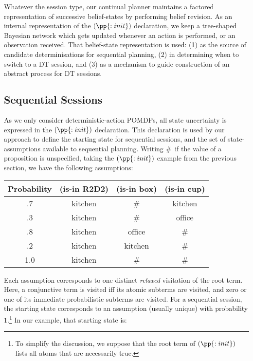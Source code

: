 Whatever the session type, our continual planner maintains a factored
representation of successive belief-states by performing belief
revision. As an internal representation of the $(\pp{:init})$
declaration, we keep a tree-shaped Bayesian network which gets updated
whenever an action is performed, or an observation received. That
belief-state representation is used: (1) as the source of candidate
determinisations for sequential planning, (2) in determining when to
switch to a DT session, and (3) as a mechanism to guide construction
of an abstract process for DT sessions.

\subsection{Sequential Sessions}

As we only consider deterministic-action POMDPs, all state
uncertainty is expressed in the $(\pp{:init})$ declaration. This
declaration is used by our approach to define the starting state for
sequential sessions, and the set of state-assumptions available to
sequential planning.  Writing \#\ if the value of a proposition is
unspecified, taking the $(\pp{:init})$ example from the previous
section, we have the following assumptions:

\small
\begin{tabular}{cccc}
\hline
Probability & (is-in R2D2)  & (is-in box)  & (is-in cup) \\
\hline
.7 & kitchen & \# &  kitchen\\
.3 & kitchen & \# & office \\
.8 & kitchen & office & \# \\
.2 & kitchen & kitchen & \# \\
1.0 & kitchen & \# & \# \\
\hline
\end{tabular}
\normalsize

\noindent Each assumption corresponds to one distinct {\em
relaxed} visitation of the root term. Here, a conjunctive term is
visited iff its atomic subterms are visited, and zero or one of its
immediate probabilistic subterms are visited. For a sequential
session, the starting state corresponds to an assumption (usually
unique) with probability $1$.\footnote{To simplify the discussion, we
suppose that the root term of $(\pp{:init})$ lists all atoms that are
necessarily true.} In our example, that starting state is:

